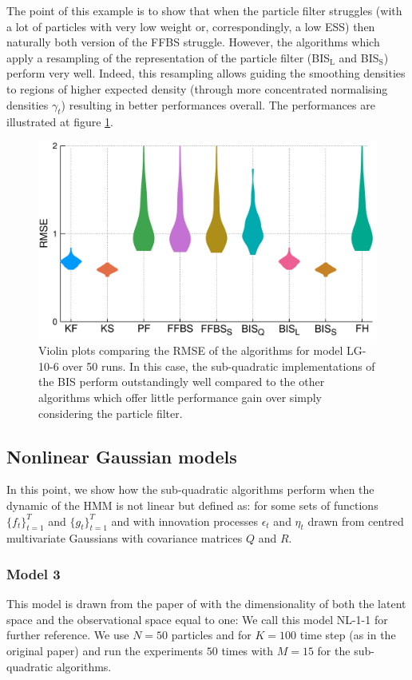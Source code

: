 The point of this example is to show that when the particle filter struggles (with a lot of particles with very low weight or, correspondingly, a low ESS) then naturally both version of the FFBS struggle. 
However, the algorithms which apply a resampling of the representation of the particle filter (BIS$_{\text{L}}$ and BIS$_{\text{S}}$) perform very well. Indeed, this resampling allows guiding the smoothing densities to regions of higher expected density (through more concentrated normalising densities $\gamma_{t}$) resulting in better performances overall. The performances are illustrated at figure \ref{comp-model2}.

\begin{figure}[!h]
\center
\includegraphics[width=.75\textwidth]{figures/tfs/comparison_mod2}
\caption{\label{comp-model2}Violin plots comparing the RMSE of the algorithms for model LG-10-6 over 50 runs. In this case, the sub-quadratic implementations of the BIS perform outstandingly well compared to the other algorithms which offer little performance gain over simply considering the particle filter.}
\end{figure}

\newpage

\subsection{Nonlinear Gaussian models}
In this point, we show how the sub-quadratic algorithms perform when the dynamic of the HMM is not linear but defined as:
%
%
for some sets of functions $\{f_{t}\}_{t=1}^{T}$ and $\{g_{t}\}_{t=1}^{T}$ and with innovation processes $\epsilon_{t}$ and $\eta_{t}$ drawn from centred multivariate Gaussians with covariance matrices $Q$ and $R$.

\subsubsection{Model 3}
This model is drawn from the paper of \citet{arulampalam02} with the dimensionality of both the latent space and the observational space equal to one:
%
%
We call this model NL-1-1 for further reference. We use $N=50$ particles and for $K=100$ time step (as in the original paper) and run the experiments $50$ times with $M=15$ for the sub-quadratic algorithms.

